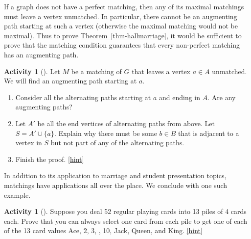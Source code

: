 \documentclass[10pt,]{book}
\theoremstyle{plain}
\theoremstyle{definition}
\theoremstyle{definition}
\theoremstyle{definition}
\newtheorem{activity}[project]{Activity}
\numberwithin{equation}{chapter}
\begin{document}
\hypertarget{p-451}{}%
If a graph does not have a perfect matching, then any of its maximal matchings must leave a vertex unmatched.  In particular, there cannot be an augmenting path starting at such a vertex (otherwise the maximal matching would not be maximal).  Thus to prove \hyperref[thm-hallmarriage]{Theorem~\ref{thm-hallmarriage}}, it would be sufficient to prove that the matching condition guarantees that every non-perfect matching has an augmenting path.%
\begin{activity}[]\label{activity-53}
\hypertarget{p-452}{}%
Let \(M\) be a matching of \(G\) that leaves a vertex \(a \in A\) unmatched.  We will find an augmenting path starting at \(a\).%
\begin{enumerate}[font=\bfseries,label=(\alph*),ref=\alph*]
\item\label{task-63} \hypertarget{p-453}{}%
Consider all the alternating paths starting at \(a\) and ending in \(A\).  Are any augmenting paths?%
\item\label{task-64} \hypertarget{p-454}{}%
Let \(A'\) be all the end vertices of alternating paths from above.  Let \(S = A' \cup \{a\}\).  Explain why there must be some \(b \in B\) that is adjacent to a vertex in \(S\) but not part of any of the alternating paths.%
\item\label{task-65} \hypertarget{p-455}{}%
Finish the proof.%
\hfill{\tiny\hyperlink{a-60.c}{[hint]}\hypertarget{q-60.c}{}}\end{enumerate}
\end{activity}
\hypertarget{p-457}{}%
In addition to its application to marriage and student presentation topics, matchings have applications all over the place. We conclude with one such example.%
\begin{activity}[]\label{activity-54}
\hypertarget{p-458}{}%
Suppose you deal 52 regular playing cards into 13 piles of 4 cards each. Prove that you can always select one card from each pile to get one of each of the 13 card values Ace, 2, 3, \textellipsis{}, 10, Jack, Queen, and King.%
\hfill{\tiny\hyperlink{a-61}{[hint]}\hypertarget{q-61}{}}\end{activity}
\end{document}
